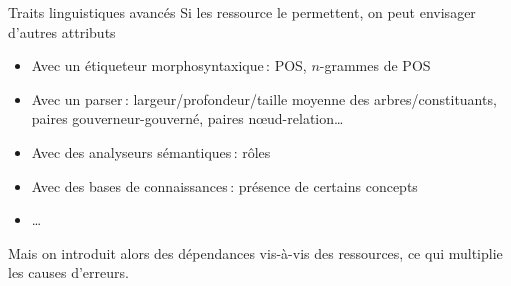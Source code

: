 \documentclass[hyperref={unicode}, xcolor={svgnames}, french]{beamer}
\begin{document}
\begin{frame}{Traits linguistiques avancés}
    Si les ressource le permettent, on peut envisager d'autres attributs
    \begin{itemize}
        \item Avec un étiqueteur morphosyntaxique : POS, $n$-grammes de POS
        \item Avec un parser : largeur/profondeur/taille moyenne des arbres/constituants, paires gouverneur-gouverné, paires nœud-relation…
        \item Avec des analyseurs sémantiques : rôles
        \item Avec des bases de connaissances : présence de certains concepts
        \item …
    \end{itemize}
    Mais on introduit alors des dépendances vis-à-vis des ressources, ce qui multiplie les causes d'erreurs.
\end{frame}
%
%
\end{document}
